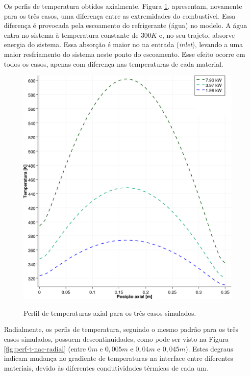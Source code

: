 Os perfis de temperatura obtidos axialmente, Figura \ref{fig:perf-t-nac-axial},
apresentam, novamente para os três casos, uma diferença entre as extremidades
do combustível. Essa diferença é provocada pela escoamento do refrigerante (água) no
modelo. A água entra no sistema à temperatura constante de $300 K$ e, no seu trajeto,
absorve energia do sistema. Essa absorção é maior no na entrada (\textit{inlet}),
levando a uma maior resfriamento do sistema neste ponto do escoamento. Esse efeito
ocorre em todos os casos, apenas com diferença nas temperaturas de cada material.

\begin{figure}[htb]
  \caption{Perfil de temperaturas axial para os três casos simulados.}
  \centering\includegraphics[scale=0.5]{figuras/T_z_NC_square_port.png}
  \label{fig:perf-t-nac-axial}
\end{figure}

Radialmente, os perfis de temperatura, seguindo o mesmo padrão para os três casos simulados,
possuem descontinuidades, como pode ser visto na Figura \ref{fig:perf-t-nac-radial} (entre
$0 m$ e $0,005 m$ e $0,04 m$ e $0,045 m$). Estes degraus indicam mudança no gradiente de temperaturas na
interface entre diferentes materiais, devido às diferentes condutividades térmicas de cada um.

